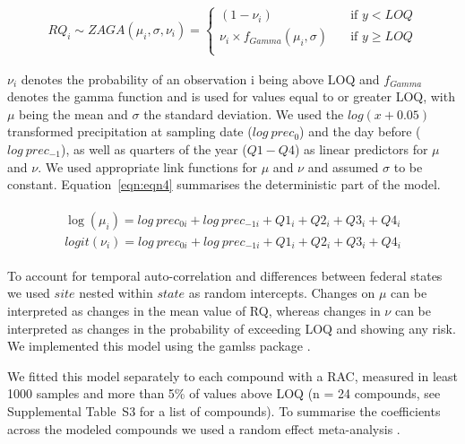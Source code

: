 \documentclass[journal=esthag,manuscript=article]{achemso}
\begin{document}
\begin{align}
RQ_i \sim ZAGA(\mu_i, \sigma, \nu_i) = 
  \begin{cases}
    (1 - \nu_i)   & \quad  \text{if } y < LOQ \\
    \nu_i \times f_{Gamma} (\mu_i, \sigma) & \quad \text{if } y \ge LOQ \\
  \end{cases}
  \label{eqn:eqn3}
\end{align}

$\nu_i$ denotes the probability of an observation i being above LOQ and $f_{Gamma}$ denotes the gamma function and is used for values equal to or greater LOQ, with $\mu$ being the mean and $\sigma$ the standard deviation.
We used the $log(x+0.05)$ transformed precipitation at sampling date ($log~prec_0$) and the day before ($log~prec_{-1}$), as well as quarters of the year ($Q1-Q4$) as linear predictors for $\mu$ and $\nu$. 
We used appropriate link functions for $\mu$ and $\nu$ and assumed $\sigma$ to be constant. 
Equation~\ref{eqn:eqn4} summarises the deterministic part of the model.

\begin{align}
\begin{split}
\log(\mu_{i}) = log~prec_{0 i} + log~prec_{-1 i} + Q1_{i} + Q2_{i}+Q3_{i}+Q4_{i}\\
logit(\nu_{i}) = log~prec_{0 i} + log~prec_{-1 i} + Q1_{i} + Q2_{i}+Q3_{i}+Q4_{i}
\end{split}
\label{eqn:eqn4}
\end{align}

To account for temporal auto-correlation and differences between federal states we used $site$ nested within $state$ as random intercepts.
Changes on $\mu$ can be interpreted as changes in the mean value of RQ, whereas changes in $\nu$ can be interpreted as changes in the probability of exceeding LOQ and showing any risk. 
We implemented this model using the gamlss package \cite{stasinopoulos_generalized_2007}.

We fitted this model separately to each compound with a RAC, measured in least 1000 samples and more than 5\% of values above LOQ (n = 24 compounds, see Supplemental Table~S3 for a list of compounds). 
To summarise the coefficients across the modeled compounds we used a random effect meta-analysis \citep{harrison_getting_2011}.




\end{document}
